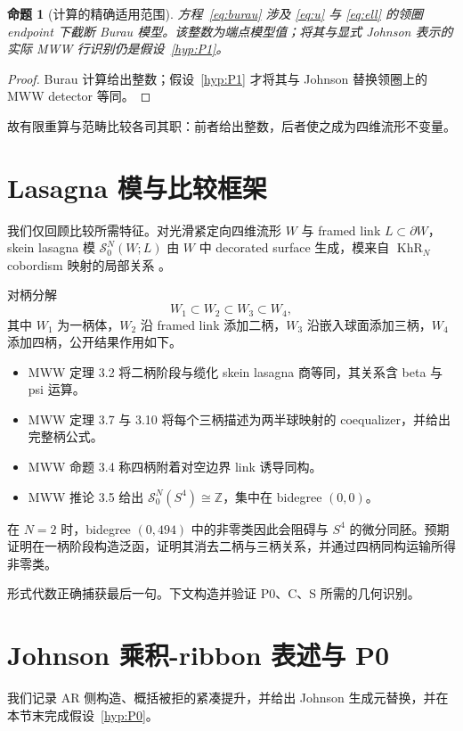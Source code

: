 \documentclass[11pt]{amsart}
\newtheorem{proposition}[theorem]{命题}
\theoremstyle{definition}
\theoremstyle{remark}
\newcommand{\Z}{\mathbb{Z}}
\newcommand{\SN}{\mathcal{S}^{N}_{0}}
\newcommand{\KhR}{\operatorname{KhR}}
\begin{document}
\begin{proposition}[计算的精确适用范围]\label{prop:scope}
方程~\eqref{eq:burau} 涉及 \eqref{eq:u} 与 \eqref{eq:ell} 的领圈 endpoint 下截断 Burau 模型。该整数为端点模型值；将其与显式 Johnson 表示的实际 MWW 行识别仍是假设~\ref{hyp:P1}。
\end{proposition}

\begin{proof}
Burau 计算给出整数；假设~\ref{hyp:P1} 才将其与 Johnson 替换领圈上的 MWW detector 等同。
\end{proof}

故有限重算与范畴比较各司其职：前者给出整数，后者使之成为四维流形不变量。


\section{Lasagna 模与比较框架}

我们仅回顾比较所需特征。对光滑紧定向四维流形 $W$ 与 framed link $L\subset\partial W$，skein lasagna 模 $\SN(W;L)$ 由 $W$ 中 decorated surface 生成，模来自 $\KhR_N$ cobordism 映射的局部关系 \cite{MorrisonWalkerWedrich2019,ManolescuWalkerWedrich2023}。

对柄分解
\[
W_1\subset W_2\subset W_3\subset W_4,
\]
其中 $W_1$ 为一柄体，$W_2$ 沿 framed link 添加二柄，$W_3$ 沿嵌入球面添加三柄，$W_4$ 添加四柄，公开结果作用如下。
\begin{itemize}
\item MWW 定理 3.2 将二柄阶段与缆化 skein lasagna 商等同，其关系含 beta 与 psi 运算。
\item MWW 定理 3.7 与 3.10 将每个三柄描述为两半球映射的 coequalizer，并给出完整柄公式。
\item MWW 命题 3.4 称四柄附着对空边界 link 诱导同构。
\item MWW 推论 3.5 给出 $\SN(S^4)\cong\Z$，集中在 bidegree $(0,0)$。
\end{itemize}

在 $N=2$ 时，bidegree $(0,494)$ 中的非零类因此会阻碍与 $S^4$ 的微分同胚。预期证明在一柄阶段构造泛函，证明其消去二柄与三柄关系，并通过四柄同构运输所得非零类。

形式代数正确捕获最后一句。下文构造并验证 P0、C、S 所需的几何识别。
\section{Johnson 乘积-ribbon 表述与 P0}\label{sec:johnson-presentation}

我们记录 AR 侧构造、概括被拒的紧凑提升，并给出
Johnson 生成元替换，并在本节末完成假设~\ref{hyp:P0}。
\end{document}
